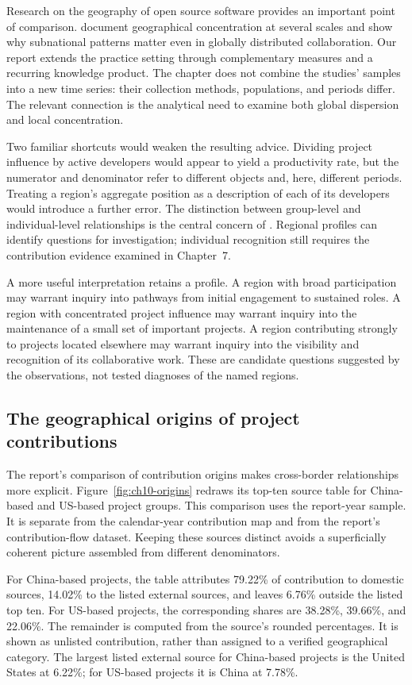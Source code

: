 Research on the geography of open source software provides an important point of comparison. \citet{wachs2022} document geographical concentration at several scales and show why subnational patterns matter even in globally distributed collaboration. Our report extends the practice setting through complementary measures and a recurring knowledge product. The chapter does not combine the studies' samples into a new time series: their collection methods, populations, and periods differ. The relevant connection is the analytical need to examine both global dispersion and local concentration.

Two familiar shortcuts would weaken the resulting advice. Dividing project influence by active developers would appear to yield a productivity rate, but the numerator and denominator refer to different objects and, here, different periods. Treating a region's aggregate position as a description of each of its developers would introduce a further error. The distinction between group-level and individual-level relationships is the central concern of \citet{robinson1950}. Regional profiles can identify questions for investigation; individual recognition still requires the contribution evidence examined in Chapter~7.

A more useful interpretation retains a profile. A region with broad participation may warrant inquiry into pathways from initial engagement to sustained roles. A region with concentrated project influence may warrant inquiry into the maintenance of a small set of important projects. A region contributing strongly to projects located elsewhere may warrant inquiry into the visibility and recognition of its collaborative work. These are candidate questions suggested by the observations, not tested diagnoses of the named regions.

\subsection{The geographical origins of project contributions}
The report's comparison of contribution origins makes cross-border relationships more explicit. Figure~\ref{fig:ch10-origins} redraws its top-ten source table for China-based and US-based project groups. This comparison uses the report-year sample. It is separate from the calendar-year contribution map and from the report's contribution-flow dataset. Keeping these sources distinct avoids a superficially coherent picture assembled from different denominators.

For China-based projects, the table attributes 79.22\% of contribution to domestic sources, 14.02\% to the listed external sources, and leaves 6.76\% outside the listed top ten. For US-based projects, the corresponding shares are 38.28\%, 39.66\%, and 22.06\%. The remainder is computed from the source's rounded percentages. It is shown as unlisted contribution, rather than assigned to a verified geographical category. The largest listed external source for China-based projects is the United States at 6.22\%; for US-based projects it is China at 7.78\%.

